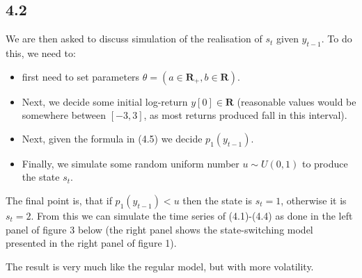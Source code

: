 \documentclass[11pt,a4paper,oneside]{article}
\newcommand{\lp}{\left(}
\newcommand{\rp}{\right)}
\newcommand{\rr}{\mathbf{R}}
\begin{document}
\subsection{4.2}
We are then asked to discuss simulation of the realisation of $s_t$ given $y_{t-1}$. To do this, we need to:
\begin{itemize}
    \item first need to set parameters $\theta = \lp a \in \rr_+, b\in \rr\rp$.
    \item Next, we decide some initial log-return $y[0] \in \rr$ (reasonable values would be somewhere between $[-3, 3]$, as most returns produced fall in this interval).
    \item Next, given the formula in (4.5) we decide $p_1\lp y_{t-1}\rp$.
    \item Finally, we simulate some random uniform number $u\sim U\lp 0, 1\rp$ to produce the state $s_t$.
\end{itemize}

The final point is, that if $p_1\lp y_{t-1}\rp < u$ then the state is $s_t = 1$, otherwise it is $s_t = 2$. From this we can simulate the time series of (4.1)-(4.4) as done in the left panel of figure 3 below (the right panel shows the state-switching model presented in the right panel of figure 1).

The result is very much like the regular model, but with more volatility.
\end{document}
